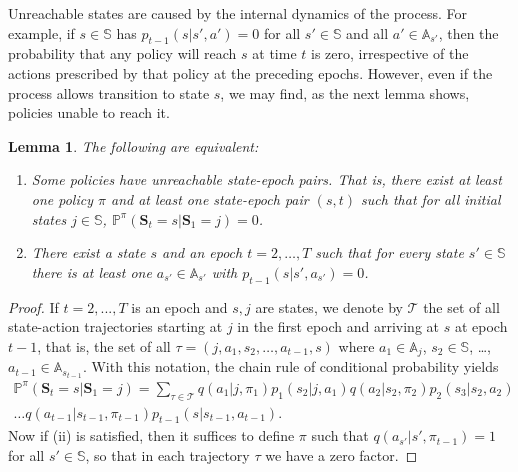 \documentclass{article}
\newtheorem{lemma}[theorem]{Lemma}
\theoremstyle{definition}
\numberwithin{equation}{section}
\begin{document}
{Unreachable states are caused by the internal dynamics of the process. For example, if $s \in \mathbb{S}$ has $p_{t-1}(s|s',a')=0$ for all $s'\in \mathbb{S}$ and all $a'\in \mathbb{A}_{s'}$, then the probability that any policy will reach $s$ at time $t$ is zero, irrespective of the actions prescribed by that policy at the preceding epochs. However, even if the process allows transition to state $s$, we may find, as the next lemma shows, policies unable to reach it.
%
\begin{lemma}
\label{unreach1}
    The following are equivalent:
    \begin{enumerate}
       \item[{\rm (i)}] %
       Some policies have unreachable state-epoch pairs. That is, there exist at least one policy $\pi$ and at least one state-epoch pair $(s, t)$ such that for all initial states $j \in \mathbb{S}$, $\mathbb P^\pi(\textbf{S}_t=s|\textbf{S}_1=j)=0$.
       \item[{\rm (ii)}] There exist a state $s$ and an epoch $t = 2, \dots, T$ such that for every state $s' \in \mathbb{S}$ there is at least one $a_{s'}\in \mathbb{A}_{s'}$  with $p_{t-1}(s|s',a_{s'})=0$.
    \end{enumerate}
\end{lemma}
\begin{proof}
If $t = 2, ..., T$ is an epoch and $s, j$ are states, we denote by $\mathscr T$ the set of all state-action trajectories starting at $j$ in the first epoch and arriving at $s$ at epoch $t-1$, 
that is, the set of all $\tau = (j, a_1, s_2, \dots, a_{t-1}, s)$ where $a_1 \in \mathbb{A}_{j}$, $s_2 \in \mathbb{S}$, \dots, $a_{t-1} \in \mathbb{A}_{s_{t-1}}$. With this notation, the chain rule of conditional probability %
yields
\begin{multline*}
\label{prob_path}
\mathbb{P}^{\pi}(\textbf{S}_t = s | \textbf{S}_1 = j) = \sum_{\tau \in \mathscr T} q(a_1 | j, \pi_1)p_1(s_2 | j, a_1)q(a_2 | s_2, \pi_2)p_2(s_3 | s_2, a_2)\\\dots q(a_{t-1} | s_{t-1}, \pi_{t-1})p_{t-1}(s | s_{t-1}, a_{t-1}).
\end{multline*}
Now if (ii) is satisfied, then it suffices to define $\pi$ such that
$q(a_{s'}|s',\pi_{t-1}) = 1$ for all $s' \in \mathbb{S}$, so that in each trajectory $\tau$ we have a zero factor.  




\end{proof}}
\end{document}
